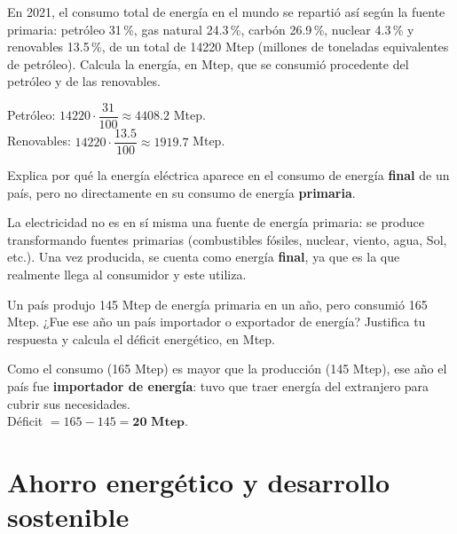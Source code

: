 \begin{exercise}
    En 2021, el consumo total de energía en el mundo se repartió así según la fuente primaria: petróleo 31\,\%, gas natural \num{24.3}\,\%, carbón \num{26.9}\,\%, nuclear \num{4.3}\,\% y renovables \num{13.5}\,\%, de un total de \num{14220} Mtep (millones de toneladas equivalentes de petróleo). Calcula la energía, en Mtep, que se consumió procedente del petróleo y de las renovables.
    \begin{solu}
        Petróleo: \(\num{14220} \cdot \dfrac{31}{100} \approx \num{4408.2}\) Mtep. \\
        Renovables: \(\num{14220} \cdot \dfrac{\num{13.5}}{100} \approx \num{1919.7}\) Mtep.
    \end{solu}
\end{exercise}

\begin{exercise}
    Explica por qué la energía eléctrica aparece en el consumo de energía \textbf{final} de un país, pero no directamente en su consumo de energía \textbf{primaria}.
    \begin{solu}
        La electricidad no es en sí misma una fuente de energía primaria: se produce transformando fuentes primarias (combustibles fósiles, nuclear, viento, agua, Sol, etc.). Una vez producida, se cuenta como energía \textbf{final}, ya que es la que realmente llega al consumidor y este utiliza.
    \end{solu}
\end{exercise}

\begin{exercise}
    Un país produjo 145 Mtep de energía primaria en un año, pero consumió 165 Mtep. ¿Fue ese año un país importador o exportador de energía? Justifica tu respuesta y calcula el déficit energético, en Mtep.
    \begin{solu}
        Como el consumo (165 Mtep) es mayor que la producción (145 Mtep), ese año el país fue \textbf{importador de energía}: tuvo que traer energía del extranjero para cubrir sus necesidades. \\
        Déficit \(= 165 - 145 = \textbf{20 Mtep}\).
    \end{solu}
\end{exercise}


\section{Ahorro energético y desarrollo sostenible}

